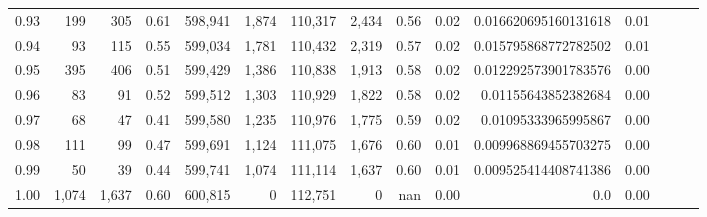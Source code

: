 \begin{tabular}{rrrrrrrrrrrrrrr}
0.93 &     199 &    305 &  0.61 &  598,941 &    1,874 &  110,317 &    2,434 &  0.56 &  0.02 &  0.016620695160131618 &      0.01 \\
0.94 &      93 &    115 &  0.55 &  599,034 &    1,781 &  110,432 &    2,319 &  0.57 &  0.02 &  0.015795868772782502 &      0.01 \\
0.95 &     395 &    406 &  0.51 &  599,429 &    1,386 &  110,838 &    1,913 &  0.58 &  0.02 &  0.012292573901783576 &      0.00 \\
0.96 &      83 &     91 &  0.52 &  599,512 &    1,303 &  110,929 &    1,822 &  0.58 &  0.02 &   0.01155643852382684 &      0.00 \\
0.97 &      68 &     47 &  0.41 &  599,580 &    1,235 &  110,976 &    1,775 &  0.59 &  0.02 &   0.01095333965995867 &      0.00 \\
0.98 &     111 &     99 &  0.47 &  599,691 &    1,124 &  111,075 &    1,676 &  0.60 &  0.01 &  0.009968869455703275 &      0.00 \\
0.99 &      50 &     39 &  0.44 &  599,741 &    1,074 &  111,114 &    1,637 &  0.60 &  0.01 &  0.009525414408741386 &      0.00 \\
1.00 &   1,074 &  1,637 &  0.60 &  600,815 &        0 &  112,751 &        0 &   nan &  0.00 &                   0.0 &      0.00 \\
\bottomrule
\end{tabular}
